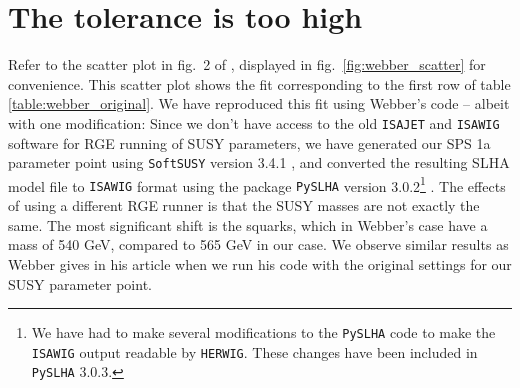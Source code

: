 \documentclass[twoside,english]{uiofysmaster}
\begin{document}
\section{The tolerance is too high}

Refer to the scatter plot in fig.\ 2 of \cite{Webber:2009vm}, displayed in fig.\ \ref{fig:webber_scatter} for convenience. This scatter plot shows the fit corresponding to the first row of table \ref{table:webber_original}. We have reproduced this fit using Webber's code \cite{Webber:epost} -- albeit with one modification: Since we don't have access to the old {\tt ISAJET} and {\tt ISAWIG} software for RGE running of SUSY parameters, we have generated our SPS 1a parameter point using {\tt SoftSUSY} version 3.4.1 \cite{Allanach:2001kg}, and converted the resulting SLHA \cite{Skands:2003cj} model file to {\tt ISAWIG} format using the package {\tt PySLHA} version 3.0.2\footnote{We have had to make several modifications to the {\tt PySLHA} code to make the {\tt ISAWIG} output readable by {\tt HERWIG}. These changes have been included in {\tt PySLHA} 3.0.3.} \cite{Buckley:2013jua}. The effects of using a different RGE runner is that the SUSY masses are not exactly the same. The most significant shift is the squarks, which in Webber's case have a mass of 540 GeV, compared to 565 GeV in our case. We observe similar results as Webber gives in his article when we run his code with the original settings for our SUSY parameter point. 
\end{document}
